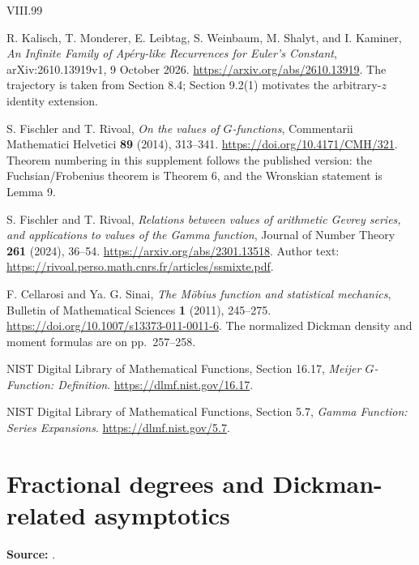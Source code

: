 \documentclass[11pt,a4paper]{article}
\theoremstyle{definition}
\theoremstyle{remark}
\numberwithin{equation}{section}
\renewcommand{\thesection}{\Roman{part}.\arabic{section}}
\renewcommand{\theHsection}{\arabic{part}.main.\arabic{section}}
\begin{document}
\clearpage
\begin{thebibliography}{VIII.99}

R. Kalisch, T. Monderer, E. Leibtag, S. Weinbaum, M. Shalyt, and
I. Kaminer,
\emph{An Infinite Family of Ap\'ery-like Recurrences for Euler's Constant},
arXiv:2610.13919v1, 9 October 2026.
\url{https://arxiv.org/abs/2610.13919}.
The trajectory is taken from Section 8.4; Section 9.2(1) motivates the
arbitrary-$z$ identity extension.

S. Fischler and T. Rivoal,
\emph{On the values of $G$-functions},
Commentarii Mathematici Helvetici \textbf{89} (2014), 313--341.
\url{https://doi.org/10.4171/CMH/321}.
Theorem numbering in this supplement follows the published version:
the Fuchsian/Frobenius theorem is Theorem 6, and the Wronskian statement
is Lemma 9.

S. Fischler and T. Rivoal,
\emph{Relations between values of arithmetic Gevrey series, and
applications to values of the Gamma function},
Journal of Number Theory \textbf{261} (2024), 36--54.
\url{https://arxiv.org/abs/2301.13518}.
Author text:
\url{https://rivoal.perso.math.cnrs.fr/articles/ssmixte.pdf}.

F. Cellarosi and Ya. G. Sinai,
\emph{The M\"obius function and statistical mechanics},
Bulletin of Mathematical Sciences \textbf{1} (2011), 245--275.
\url{https://doi.org/10.1007/s13373-011-0011-6}.
The normalized Dickman density and moment formulas are on
pp.~257--258.

NIST Digital Library of Mathematical Functions,
Section 16.17, \emph{Meijer $G$-Function: Definition}.
\url{https://dlmf.nist.gov/16.17}.

NIST Digital Library of Mathematical Functions,
Section 5.7, \emph{Gamma Function: Series Expansions}.
\url{https://dlmf.nist.gov/5.7}.

\end{thebibliography}
\label{part7:end}
\clearpage
\setcounter{section}{0}\setcounter{subsection}{0}
\renewcommand{\thesection}{\Roman{part}.\arabic{section}}
\renewcommand{\theHsection}{\arabic{part}.main.\arabic{section}}
\renewcommand{\refname}{References for Part VIII}
\part{Fractional degrees and Dickman-related asymptotics}
\label{part8:start}
\noindent\textbf{Source:} {\small{}}.
\end{document}
